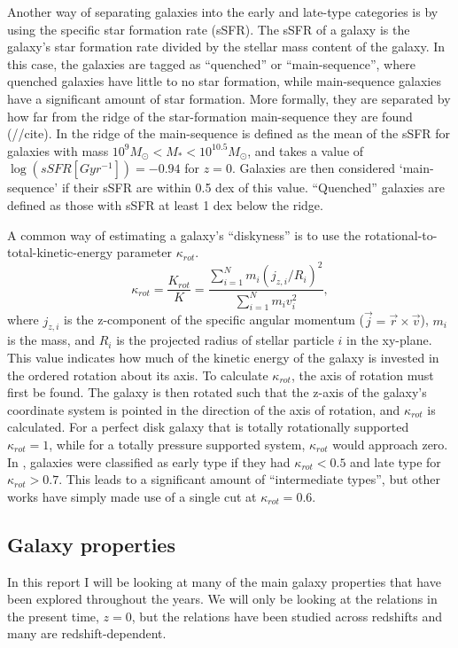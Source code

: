 Another way of separating galaxies into the early and late-type categories is by using the specific star formation rate (sSFR). The sSFR of a galaxy is the galaxy's star formation rate divided by the stellar mass content of the galaxy. In this case, the galaxies are tagged as ``quenched'' or ``main-sequence'', where quenched galaxies have little to no star formation, while main-sequence galaxies have a significant amount of star formation. More formally, they are separated by how far from the ridge of the star-formation main-sequence they are found (//cite). In \textcite{Genel2017} the ridge of the main-sequence is defined as the mean of the sSFR for galaxies with mass $10^{9} M_{\odot} < M_* < 10^{10.5} M_{\odot}$, and takes a value of $\log (sSFR[Gyr^{-1}]) = -0.94$ for $z=0$. Galaxies are then considered `main-sequence' if their sSFR are within 0.5 dex of this value. ``Quenched'' galaxies are defined as those with sSFR at least 1 dex below the ridge.

A common way of estimating a galaxy's ``diskyness'' is to use the rotational-to-total-kinetic-energy parameter $\kappa_{rot}$. 
\begin{equation}
    \kappa_{rot} = \frac{K_{rot}}{K} = \frac{\sum_{i=1}^{N} m_i (j_{z, i}/R_i)^2}{\sum_{i=1}^{N} m_i v_i^2},
\end{equation}
where $j_{z, i}$ is the z-component of the specific angular momentum ($\vec{j} = \vec{r} \times \vec{v}$), $m_i$ is the mass, and $R_i$ is the projected radius of stellar particle $i$ in the xy-plane. 
This value indicates how much of the kinetic energy of the galaxy is invested in the ordered rotation about its axis. To calculate $\kappa_{rot}$, the axis of rotation must first be found. The galaxy is then rotated such that the z-axis of the galaxy's coordinate system is pointed in the direction of the axis of rotation, and $\kappa_{rot}$ is calculated.
For a perfect disk galaxy that is totally rotationally supported $\kappa_{rot} = 1$, while for a totally pressure supported system, $\kappa_{rot}$ would approach zero. In \textcite{Sales2012}, galaxies were classified as early type if they had $\kappa_{rot} < 0.5$ and late type for $\kappa_{rot} > 0.7$. This leads to a significant amount of ``intermediate types'', but other works have simply made use of a single cut at $\kappa_{rot} = 0.6$.

\subsection{Galaxy properties}
In this report I will be looking at many of the main galaxy properties that have been explored throughout the years. We will only be looking at the relations in the present time, $z=0$, but the relations have been studied across redshifts and many are redshift-dependent.

